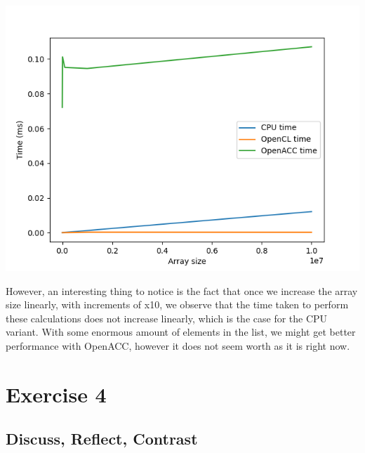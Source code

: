 \documentclass[english]{exam}
\begin{document}
{  \begin{center}
    \includegraphics[scale=0.65]{plot2.png}
  \end{center}

  However, an interesting thing to notice is the fact that once we increase the array size linearly, with increments of x10, we observe that the time taken to perform these calculations does not increase linearly, which is the case for the CPU variant. With some enormous amount of elements in the list, we might get better performance with OpenACC, however it does not seem worth as it is right now.

\clearpage
\chapter{Exercise 4}
\section*{Discuss, Reflect, Contrast}

}
\end{document}
